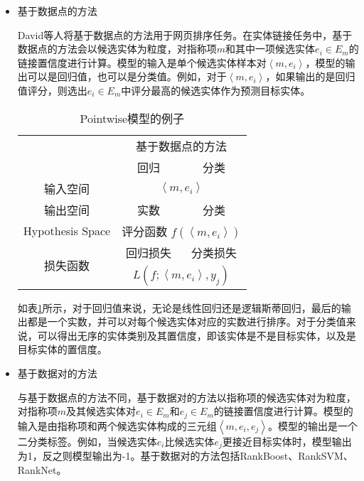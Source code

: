 \begin{itemize}
	\item {基于数据点的方法
		
		David等人\cite{SRUR}将基于数据点的方法用于网页排序任务。在实体链接任务中，基于数据点的方法会以候选实体为粒度，对指称项$m$和其中一项候选实体$e_i\in E_m$的链接置信度进行计算。模型的输入是单个候选实体样本对$\left\langle m,e_i\right\rangle $，模型的输出可以是回归值，也可以是分类值。例如，对于$\left\langle m,e_i\right\rangle $，如果输出的是回归值评分，则选出$e_i\in E_m$中评分最高的候选实体作为预测目标实体。
		
		\begin{table}[!htb]
			\caption{Pointwise模型的例子\label{tab:piontwise}}
			\begin{center}
				\begin{tabular}{|c|c|c|}
					\hline
					\multirow{2}{*}{} & \multicolumn{2}{c|}{基于数据点的方法} \\ \cline{2-3}
					& 回归 & 分类 \\ \hline
					输入空间 & \multicolumn{2}{c|}{$\left\langle m,e_i\right\rangle $} \\ \hline
					输出空间 & 实数 & 分类 \\ \hline
					Hypothesis Space & \multicolumn{2}{c|}{评分函数 $f(\left\langle m,e_i\right\rangle)$} \\ \hline
					\multirow{2}{*}{损失函数} & 回归损失 & 分类损失 \\ \cline{2-3}
					& \multicolumn{2}{c|}{$L(f;\left\langle m,e_i\right\rangle,y_j)$} \\ \hline
				\end{tabular}
			\end{center}
		\end{table}
	
	如表\ref{tab:piontwise}所示，对于回归值来说，无论是线性回归还是逻辑斯蒂回归，最后的输出都是一个实数，并可以对每个候选实体对应的实数进行排序。对于分类值来说，可以得出无序的实体类别及其置信度，即该实体是不是目标实体，以及是目标实体的置信度。
	}
	\item {基于数据对的方法
		
		与基于数据点的方法不同，基于数据对的方法以指称项的候选实体对为粒度，对指称项$m$及其候选实体对$e_i\in E_m$和$e_j\in E_m$的链接置信度进行计算。模型的输入是由指称项和两个候选实体构成的三元组$\left\langle m,e_i,e_j\right\rangle $。模型的输出是一个二分类标签。例如，当候选实体$e_i$比候选实体$e_j$更接近目标实体时，模型输出为1，反之则模型输出为-1。基于数据对的方法包括RankBoost\cite{AMIRSBOR}、RankSVM\cite{ESLRES}、RankNet\cite{ADRFPS}。
		
}
\end{itemize}
